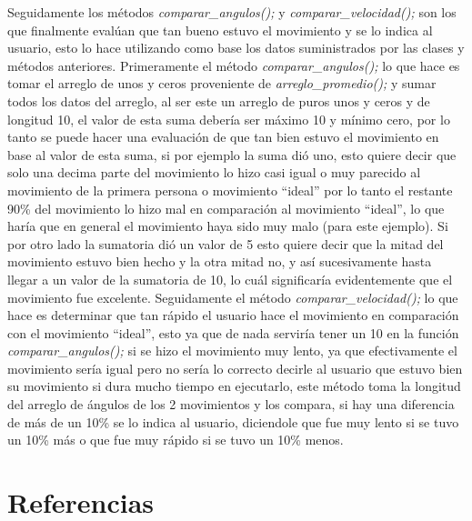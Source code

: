 \documentclass[letterpaper]{article}
\begin{document}
Seguidamente los métodos \textit{comparar\_angulos();} y \textit{comparar\_velocidad();} son los que finalmente evalúan que tan bueno estuvo el movimiento y se lo indica al usuario, esto lo hace utilizando como base los datos suministrados por las clases y métodos anteriores. Primeramente el método \textit{comparar\_angulos();} lo que hace es tomar el arreglo de unos y ceros proveniente de \textit{arreglo\_promedio();} y sumar todos los datos del arreglo, al ser este un arreglo de puros unos y ceros y de longitud 10, el valor de esta suma debería ser máximo 10 y mínimo cero, por lo tanto se puede hacer una evaluación de que tan bien estuvo 
el movimiento en base al valor de esta suma, si por ejemplo la suma dió uno, esto quiere decir que solo una decima parte del movimiento lo hizo casi igual o muy parecido al movimiento de la primera persona o movimiento ``ideal'' por lo tanto el restante 90\% del movimiento lo hizo mal en comparación al movimiento ``ideal'', lo que haría que en general el movimiento haya sido muy malo (para este ejemplo). Si por otro lado la sumatoria dió un valor de 5 esto quiere decir que la mitad del movimiento estuvo bien hecho y la otra mitad no, y así sucesivamente hasta llegar a un valor de la sumatoria de 10, lo cuál significaría evidentemente que el movimiento fue excelente. Seguidamente el método \textit{comparar\_velocidad();} 
lo que hace es determinar que tan rápido el usuario hace el movimiento en comparación con el movimiento ``ideal'', esto ya que de nada serviría tener un 10 en la función \textit{comparar\_angulos();} si se hizo el movimiento muy lento, ya que efectivamente el movimiento sería igual pero no sería lo correcto decirle al usuario que estuvo bien su movimiento si dura mucho tiempo en ejecutarlo, este método toma la longitud del arreglo de ángulos de los 2 movimientos y los compara, si hay una diferencia de más de un 10\% se lo indica al usuario, diciendole que fue muy lento si se tuvo un 10\% más o que fue muy rápido si se tuvo un 10\% menos. \\


\section{Referencias}
\end{document}
